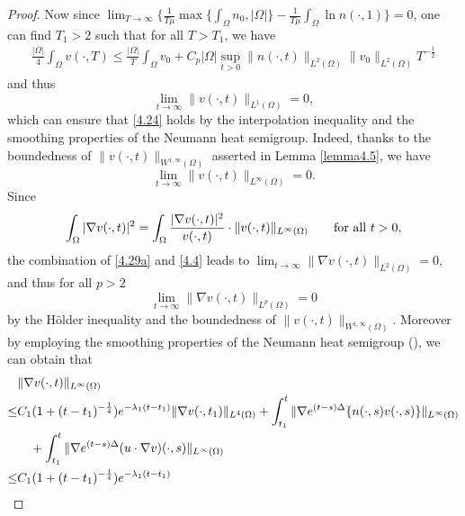 \documentclass[12pt]{article}
\theoremstyle{plain}
\theoremstyle{definition}
\numberwithin{equation}{section}
\begin{document}
\begin{proof}[Proof]
Now since $ \displaystyle\lim_{T\rightarrow \infty}\{\frac 1{T\mu}\max\{\int_\Omega  n_0,|\Omega|\}-\frac 1{T\mu} \int_\Omega \ln n(\cdot,1)  \}=0$, one can find $T_1>2$ such that for all $T>T_1$, we have
\begin{equation*}
  \begin{split}
 \frac {|\Omega|}4 \int_\Omega v(\cdot,T)
  \leq \frac{|\Omega|}T \int_\Omega v_0+ C_p |\Omega| \sup_{t>0}\|n(\cdot,t)\|_{L^2(\Omega)}  \| v_0\|_{L^2(\Omega)}T^{-\frac12}
 \end{split}
\end{equation*}
and thus
 \begin{equation}\label{4.29}
\displaystyle\lim_{t\rightarrow \infty} \|v(\cdot,t)\|_{L^{1}(\Omega)} =0,
\end{equation}
 which can ensure that   \eqref{4.24} holds by the interpolation inequality and  the smoothing properties of the Neumann heat semigroup. Indeed,
  thanks to the boundedness of  $\|v(\cdot,t)\|_{W^{1,\infty}(\Omega)} $ asserted in Lemma \ref{lemma4.5},  we have
  \begin{equation}\label{4.29a}
\displaystyle\lim_{t\rightarrow \infty} \|v(\cdot,t)\|_{L^{\infty}(\Omega)} =0.
\end{equation}
Since
$$\int_\Omega |\nabla v(\cdot,t)|^2=\int_\Omega \frac{|\nabla v(\cdot,t)|^2}{v(\cdot,t)}\cdot
 \|v(\cdot,t)\|_{L^{\infty}(\Omega)}
 \quad\quad \hbox{for all}\,\, t>0,
 $$
 the combination of \eqref{4.29a} and  \eqref{4.4} leads to
 $
\displaystyle\lim_{t\rightarrow \infty} \| \nabla v(\cdot,t)\|_{L^2(\Omega)} =0,
$
and thus for all $p>2$
 \begin{equation}\label{4.29b}
\displaystyle\lim_{t\rightarrow \infty} \| \nabla v(\cdot,t)\|_{L^p(\Omega)} =0
\end{equation}
 by the H\"{o}lder inequality and the boundedness of  $\|v(\cdot,t)\|_{W^{1,\infty}(\Omega)}$. Moreover by
  employing the smoothing properties of the Neumann heat semigroup (\cite[Lemma 2.1(iii)]{Cao}), we can obtain that
  \begin{align}\label{4.29c}
&\|\nabla v(\cdot,t)\|_{L^\infty(\Omega)}\notag\\
\leq &  C_1(1+(t-t_1)^{-\frac14}) e^{-\lambda_1(t-t_1)}
\|\nabla v(\cdot,t_1)\|_{L^4(\Omega)}
+\int_{t_1}^t
\|\nabla e^{(t-s)\Delta}\{n(\cdot,s)v(\cdot,s)\}\|_{L^\infty(\Omega)}\notag\\
&\quad+\int_{t_1}^t\|\nabla e^{(t-s)\Delta}
(u\cdot\nabla v)(\cdot,s)\|_{L^\infty(\Omega)}\\
\leq &
 C_1(1+(t-t_1)^{-\frac14}) e^{-\lambda_1(t-t_1)}

\end{align}
\end{proof}
\end{document}
